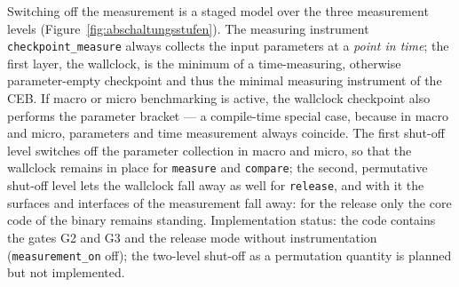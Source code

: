 \begin{nurlang}
Switching off the measurement is a staged model over the three measurement levels
(Figure~\ref{fig:abschaltungsstufen}). The measuring instrument \texttt{checkpoint\_measure} always
collects the input parameters at a \emph{point in time}; the first layer, the wallclock, is the minimum
of a time-measuring, otherwise parameter-empty checkpoint and thus the minimal measuring instrument of
the CEB\@. If macro or micro benchmarking is active, the wallclock checkpoint also performs the
parameter bracket --- a compile-time special case, because in macro and micro, parameters and time
measurement always coincide. The first shut-off level switches off the parameter collection in macro
and micro, so that the wallclock remains in place for \texttt{measure} and \texttt{compare}; the
second, permutative shut-off level lets the wallclock fall away as well for \texttt{release}, and with
it the surfaces and interfaces of the measurement fall away: for the release only the core code of the
binary remains standing. Implementation status: the code contains the gates G2 and G3 and the release
mode without instrumentation (\texttt{measurement\_on} off); the two-level shut-off as a permutation
quantity is planned but not implemented.
\begin{figure}[htbp]\centering
{}
\end{figure}
\end{nurlang}
